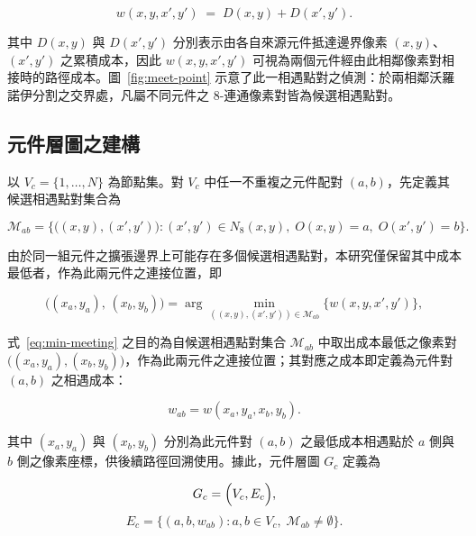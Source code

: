 \begin{equation}
  w(x, y, x', y') \;=\; D(x, y) + D(x', y').
  \label{eq:meet-cost}
\end{equation}

\noindent 其中 $D(x, y)$ 與 $D(x', y')$ 分別表示由各自來源元件抵達邊界像素 $(x, y)$、$(x', y')$ 之累積成本，因此 $w(x, y, x', y')$ 可視為兩個元件經由此相鄰像素對相接時的路徑成本。圖~\ref{fig:meet-point} 示意了此一相遇點對之偵測：於兩相鄰沃羅諾伊分割之交界處，凡屬不同元件之 8-連通像素對皆為候選相遇點對。

\subsection{元件層圖之建構}
\label{subsec:build-gc}

以 $V_c = \{1, \ldots, N\}$ 為節點集。對 $V_c$ 中任一不重複之元件配對 $(a, b)$，先定義其候選相遇點對集合為

\begin{equation}
  \mathcal{M}_{ab}
  =
  \bigl\{\bigl((x, y), (x', y')\bigr) : (x', y') \in N_8(x, y),\; O(x, y)=a,\; O(x', y')=b \bigr\}.
  \label{eq:meeting-set}
\end{equation}

\noindent 由於同一組元件之擴張邊界上可能存在多個候選相遇點對，本研究僅保留其中成本最低者，作為此兩元件之連接位置，即

\begin{equation}
  \bigl((x_a, y_a),\, (x_b, y_b)\bigr) = \arg\min_{((x, y),(x', y'))\in\mathcal{M}_{ab}} \bigl\{ w(x, y, x', y') \bigr\},
  \label{eq:min-meeting}
\end{equation}

\noindent 式~\eqref{eq:min-meeting} 之目的為自候選相遇點對集合 $\mathcal{M}_{ab}$ 中取出成本最低之像素對 $\bigl((x_a, y_a), (x_b, y_b)\bigr)$，作為此兩元件之連接位置；其對應之成本即定義為元件對 $(a, b)$ 之相遇成本：
  
\begin{equation}
  w_{ab} = w(x_a, y_a, x_b, y_b).
  \label{eq:min-meeting-cost}
\end{equation}

\noindent 其中 $(x_a, y_a)$ 與 $(x_b, y_b)$ 分別為此元件對 $(a, b)$ 之最低成本相遇點於 $a$ 側與 $b$ 側之像素座標，供後續路徑回溯使用。據此，元件層圖 $G_c$ 定義為

\begin{equation}
  G_c = \Bigl(V_c, E_c\Bigr),
  \label{eq:gc}
\end{equation}
\begin{equation}
  E_c = \bigl\{(a, b, w_{ab}) : a, b \in V_c,\; \mathcal{M}_{ab} \ne \emptyset \bigr\}.
  \label{eq:gc-edges}
\end{equation}

